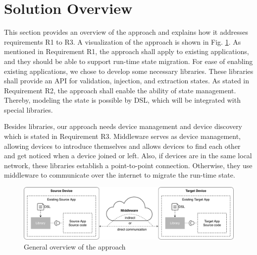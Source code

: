 \section{Solution Overview}
This section provides an overview of the approach and explains how it addresses requirements R1 to R3.
A visualization of the approach is shown in Fig. \ref{fig:solution-overview}. As mentioned in Requirement R1, the approach shall apply to existing applications, and they should be able to support run-time state migration. For ease of enabling existing applications, we chose to develop some necessary libraries. These libraries shall provide an API for validation, injection, and extraction states. As stated in Requirement R2, the approach shall enable the ability of state management. Thereby, modeling the state is possible by DSL, which will be integrated with special libraries.

Besides libraries, our approach needs device management and device discovery which is stated in Requirement R3. Middleware serves as device management, allowing devices to introduce themselves and allows devices to find each other and get noticed when a device joined or left. Also, if devices are in the same local network, these libraries establish a point-to-point connection. Otherwise, they use middleware to communicate over the internet to migrate the run-time state.

\begin{figure}[!b]
    \includegraphics[width=\linewidth]{../figures/solution-overview}
    \centering
    \caption{General overview of the approach}
    \label{fig:solution-overview}
\end{figure}
